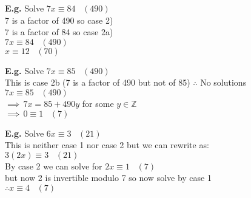 \documentclass[11pt]{article}
\begin{document}
\begin{flushleft}
	\textbf{E.g.} Solve $7x \equiv 84 \hspace{10pt} (490)$\\
	
	\hspace{25pt} 7 is a factor of 490 so case 2)\\
	\hspace{25pt} 7 is a factor of 84 so case 2a) \\
	\vspace{5pt}
	\hspace{25pt} $7x \equiv 84 \hspace{10pt}(490)$\\
	\hspace{25pt} $x \equiv 12 \hspace{10pt} (70)$
\end{flushleft}

\begin{flushleft}
	\textbf{E.g.} Solve $7x \equiv 85 \hspace{10pt} (490)$\\
	\hspace{25pt} This is case 2b (7 is a factor of 490 but not of 85) $\therefore$ No solutions	    \\
	\vspace{5pt}
	\hspace{25pt} $7x \equiv 85 \hspace{10pt} (490)$\\
	$\implies \hspace{2pt}7x = 85 + 490y $ for some $y \in \mathbb{Z}$\\
	$\implies \hspace{2pt}0 \equiv 1 \hspace{10pt} (7) $
\end{flushleft}


\begin{flushleft}
	\textbf{E.g.} Solve $6x \equiv 3 \hspace{10pt} (21) $\\
	\hspace{22pt} This is neither case 1 nor case 2 but we can rewrite as: \\
	\vspace{5pt}
	\hspace{26pt}$3(2x) \equiv 3 \hspace{10pt} (21)$\\
	\vspace{5pt}
	\hspace{26pt}By case 2 we can solve for $2x \equiv 1 \hspace{10pt} (7) $\\
	\hspace{26pt}but now 2 is invertible modulo 7 so now solve by case 1\\
	\vspace{5pt} 
	\hspace{26pt} $\therefore x\equiv 4 \hspace{10pt} (7)$
\end{flushleft}
\end{document}
